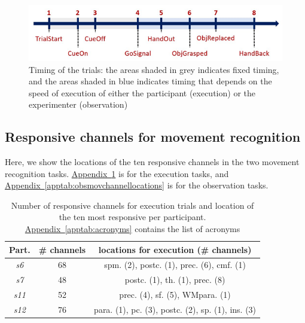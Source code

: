\documentclass[10pt,conference,compsocconf]{IEEEtran}
\newcommand{\aref}[1]{\hyperref[#1]{Appendix~\ref*{#1}}}
\begin{document}
\begin{figure}[h!]
    \center
    \includegraphics[width=\linewidth]{images/2024-12-11-13-41-48.png}
    \caption{Timing of the trials: the areas shaded in grey indicates fixed timing, and the areas shaded in blue indicates timing that depends on the speed of execution of either the participant (execution) or the experimenter (observation)}
    \label{appfig:timeline}
\end{figure}
\FloatBarrier

\subsection{Responsive channels for movement recognition}
Here, we show the locations of the ten responsive channels in the two movement recognition tasks. \aref{apptab:exmovchannellocations} is for the execution tasks, and \aref{apptab:obsmovchannellocations} is for the observation tasks.

\begin{table}[h!]
    \centering
    \begin{tabular}{| c | c | c |}
        \hline
        Part. & \# channels & locations for execution (\# channels) \\
        \hline
        \textit{s6} & 68 & spm. (2), postc. (1), prec. (6), cmf. (1) \\
        \hline
        \textit{s7} & 48 & postc. (1), th. (1), prec. (8)\\
        \hline
        \textit{s11} & 52 & prec. (4), sf. (5), WMpara. (1)\\
        \hline
        \textit{s12} & 76 & para. (1), pc. (3), postc. (2), sp. (1), ins. (3)\\
        \hline
    \end{tabular}
    \caption{Number of responsive channels for execution trials and location of the ten most responsive per participant. \aref{apptab:acronyms} contains the list of acronyms}
    \label{apptab:exmovchannellocations}
\end{table}
\end{document}
